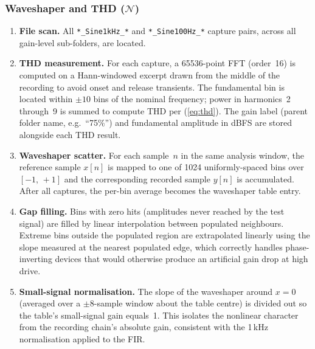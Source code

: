 \documentclass[11pt, letterpaper]{article}
\begin{document}
\subsubsection{Waveshaper and THD ($\mathcal{N}$)}
\label{sec:analysis_ws}

\begin{enumerate}
  \item \textbf{File scan.}  All \texttt{*\_Sine1kHz\_*} and
        \texttt{*\_Sine100Hz\_*} capture pairs, across all gain-level
        sub-folders, are located.

  \item \textbf{THD measurement.}  For each capture, a 65536-point
        FFT (order~16) is computed on a Hann-windowed excerpt drawn from
        the middle of the recording to avoid onset and release transients.
        The fundamental bin is located within $\pm 10$ bins of the nominal
        frequency; power in harmonics~2 through~9 is summed to compute THD
        per (\ref{eq:thd}).  The gain label (parent folder name,
        e.g.\ ``75\%'') and fundamental amplitude in dBFS are stored
        alongside each THD result.

  \item \textbf{Waveshaper scatter.}  For each sample~$n$ in the same
        analysis window, the reference sample $x[n]$ is mapped to one of
        1024 uniformly-spaced bins over $[-1,\,+1]$ and the corresponding
        recorded sample $y[n]$ is accumulated.  After all captures, the
        per-bin average becomes the waveshaper table entry.

  \item \textbf{Gap filling.}  Bins with zero hits (amplitudes never
        reached by the test signal) are filled by linear interpolation
        between populated neighbours.  Extreme bins outside the populated
        region are extrapolated linearly using the slope measured at the
        nearest populated edge, which correctly handles phase-inverting
        devices that would otherwise produce an artificial gain drop at
        high drive.

  \item \textbf{Small-signal normalisation.}  The slope of the
        waveshaper around $x = 0$ (averaged over a $\pm 8$-sample window
        about the table centre) is divided out so the table's small-signal
        gain equals~1.  This isolates the nonlinear character from the
        recording chain's absolute gain, consistent with the 1\,kHz
        normalisation applied to the FIR.
\end{enumerate}
\end{document}
